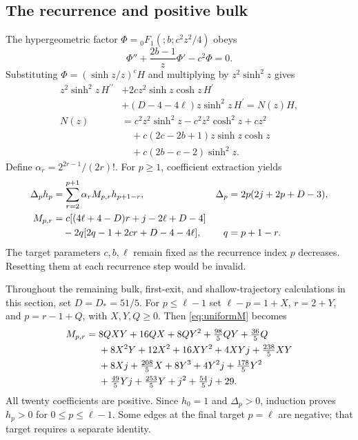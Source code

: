 \documentclass[11pt,a4paper]{article}
\theoremstyle{remark}\newtheorem{remark}[theorem]{Remark}
\begin{document}
\subsection{The recurrence and positive bulk}
The hypergeometric factor $\Phi={}_0F_1(;b;c^2z^2/4)$ obeys
\begin{equation}
 \Phi''+\frac{2b-1}{z}\Phi'-c^2\Phi=0.
\end{equation}
Substituting $\Phi=(\sinh z/z)^cH$ and multiplying by $z^2\sinh^2z$ gives
\begin{equation}\label{eq:conjugated}
\begin{split}
 z^2\sinh^2z\,H^{\prime\prime}&+2cz^2\sinh z\cosh z\,H^{\prime}\\
 &+(D-4-4\ell)z\sinh^2z\,H^{\prime}=N(z)H,\\
 N(z)&=c^2z^2\sinh^2z-c^2z^2\cosh^2z+cz^2\\
 &\quad+c(2c-2b+1)z\sinh z\cosh z\\
 &\quad+c(2b-c-2)\sinh^2z.
\end{split}
\end{equation}
Define $\alpha_r=2^{2r-1}/(2r)!$. For $p\geq1$, coefficient extraction yields
\begin{align}\label{eq:uniformrec}
 \Delta_ph_p&=\sum_{r=2}^{p+1}\alpha_rM_{p,r}h_{p+1-r},
 &\Delta_p&=2p(2j+2p+D-3),\\
 M_{p,r}&=c[(4\ell+4-D)r+j-2\ell+D-4]\notag\\
 &\quad-2q[2q-1+2cr+D-4-4\ell],
 &q&=p+1-r.\label{eq:uniformM}
\end{align}
The target parameters $c,b,\ell$ remain fixed as the recurrence index $p$ decreases. Resetting them at each recurrence step would be invalid.

Throughout the remaining bulk, first-exit, and shallow-trajectory calculations in this section, set $D=D_*=51/5$. For $p\leq\ell-1$ set $\ell-p=1+X$, $r=2+Y$, and $p=r-1+Q$, with $X,Y,Q\geq0$. Then \eqref{eq:uniformM} becomes
\begin{align}\label{eq:bulkpoly}
 M_{p,r}={}&8QXY+16QX+8QY^2+\tfrac{98}{5}QY+\tfrac{36}{5}Q\notag\\
 &+8X^2Y+12X^2+16XY^2+4XYj+\tfrac{238}{5}XY\notag\\
 &+8Xj+\tfrac{208}{5}X+8Y^3+4Y^2j+\tfrac{178}{5}Y^2\notag\\
 &+\tfrac{49}{5}Yj+\tfrac{253}{5}Y+j^2+\tfrac{54}{5}j+29.
\end{align}
All twenty coefficients are positive. Since $h_0=1$ and $\Delta_p>0$, induction proves $h_p>0$ for $0\leq p\leq\ell-1$. Some edges at the final target $p=\ell$ are negative; that target requires a separate identity.
\end{document}
